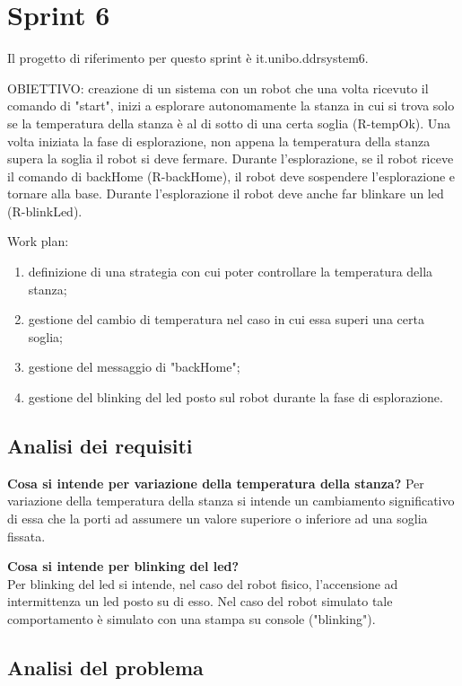 \section{Sprint 6}

Il progetto di riferimento per questo sprint è it.unibo.ddrsystem6.

OBIETTIVO: creazione di un sistema con un robot che  una volta ricevuto il comando di "start", inizi a esplorare autonomamente la stanza in cui si trova solo se la temperatura della stanza è al di sotto di una certa soglia (R-tempOk). Una volta iniziata la fase di esplorazione, non appena la temperatura della stanza supera la soglia il robot si deve fermare. 
Durante l'esplorazione, se il robot riceve il comando di backHome (R-backHome), il robot deve sospendere l'esplorazione e tornare alla base.
Durante l'esplorazione il robot deve anche far blinkare un led (R-blinkLed).

Work plan:
\begin{enumerate}
\item definizione di una strategia con cui poter controllare la temperatura della stanza;
\item gestione del cambio di temperatura nel caso in cui essa superi una certa soglia;
\item gestione del messaggio di "backHome";
\item gestione del blinking del led posto sul robot durante la fase di esplorazione.
\end{enumerate}

\subsection{Analisi dei requisiti}

\textbf{Cosa si intende per variazione della temperatura della stanza?}
Per variazione della temperatura della stanza si intende un cambiamento significativo di essa che la porti ad assumere un valore superiore o inferiore ad una soglia fissata. 

\textbf{Cosa si intende per blinking del led?}\\
Per blinking del led si intende, nel caso del robot fisico, l'accensione ad intermittenza un led posto su di esso. Nel caso del robot simulato tale comportamento è simulato con una stampa su console ("blinking").

\subsection{Analisi del problema}

